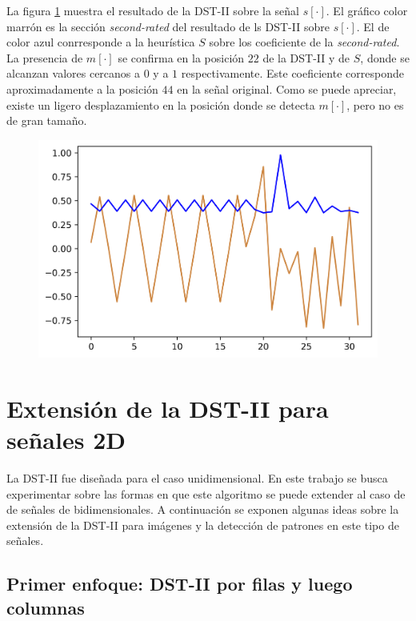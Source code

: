 La figura \ref{fig:example-guido-signal-dst-s} muestra el resultado de la DST-II sobre la señal $s[\cdot]$.
El gráfico color marrón es la sección \textit{second-rated} del resultado de ls DST-II sobre $s[\cdot]$.
El de color azul conrresponde a la heurística $S$ sobre los coeficiente de la \textit{second-rated}. 
La presencia de $m[\cdot]$ se confirma en la posición $22$ de la DST-II y de $S$, donde se alcanzan valores
cercanos a $0$ y a $1$ respectivamente. Este coeficiente corresponde aproximadamente a la posición 
$44$ en la señal original. Como se puede apreciar, existe un ligero desplazamiento en la posición donde se detecta $m[\cdot]$,
pero no es de gran tamaño.


\begin{figure}\label{fig:example-guido-signal-dst-s}
	\centering
	\includegraphics[scale=0.8]{Graphics/example-guido-signal-dst-s.png}
	\caption{}
\end{figure}


\section{Extensión de la DST-II para señales 2D}\label{section:2d}

La DST-II fue diseñada para el caso unidimensional. En este trabajo se busca experimentar sobre las formas en que
este algoritmo se puede extender al caso de de señales de bidimensionales. 
A continuación se exponen algunas ideas sobre la extensión de la DST-II para imágenes y la detección de patrones en este tipo de señales.

\subsection{Primer enfoque: DST-II por filas y luego columnas}


